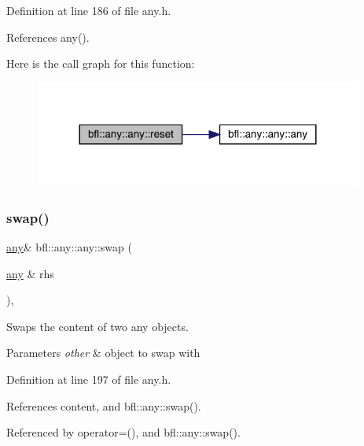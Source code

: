 Definition at line 186 of file any.\+h.



References any().

Here is the call graph for this function\+:
\nopagebreak
\begin{figure}[H]
\begin{center}
\leavevmode
\includegraphics[width=305pt]{classbfl_1_1any_1_1any_ae4e063fb12711ea99a78bdab4d5c3e36_cgraph}
\end{center}
\end{figure}
\mbox{\label{classbfl_1_1any_1_1any_a0441e5816aa5ef4721f134868b7ca402}} 
\subsubsection{\texorpdfstring{swap()}{swap()}}
{\footnotesize\ttfamily \mbox{\hyperlink{classbfl_1_1any_1_1any}{any}}\& bfl\+::any\+::any\+::swap (\begin{DoxyParamCaption}\item[{\mbox{\hyperlink{classbfl_1_1any_1_1any}{any}} \&}]{rhs }\end{DoxyParamCaption})\hspace{0.3cm}{\ttfamily [inline]}, {\ttfamily [noexcept]}}



Swaps the content of two any objects. 


\begin{DoxyParams}{Parameters}
{\em other} & object to swap with \\
\hline
\end{DoxyParams}


Definition at line 197 of file any.\+h.



References content, and bfl\+::any\+::swap().



Referenced by operator=(), and bfl\+::any\+::swap().

